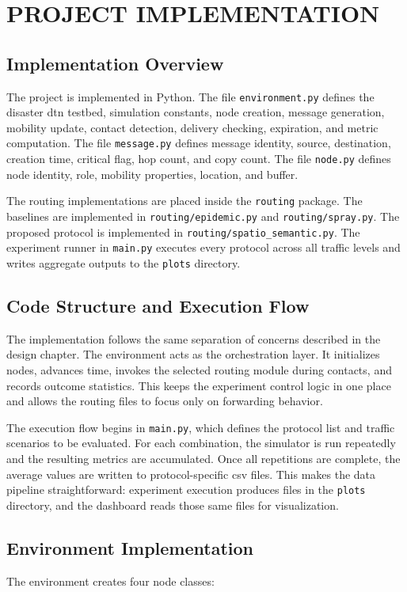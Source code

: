 \chapter{\MakeUppercase{Project Implementation}}
\section{Implementation Overview}
The project is implemented in Python. The file \verb|environment.py| defines the disaster \ac{dtn} testbed, simulation constants, node creation, message generation, mobility update, contact detection, delivery checking, expiration, and metric computation. The file \verb|message.py| defines message identity, source, destination, creation time, critical flag, hop count, and copy count. The file \verb|node.py| defines node identity, role, mobility properties, location, and buffer.

The routing implementations are placed inside the \verb|routing| package. The baselines are implemented in \verb|routing/epidemic.py| and \verb|routing/spray.py|. The proposed protocol is implemented in \verb|routing/spatio_semantic.py|. The experiment runner in \verb|main.py| executes every protocol across all traffic levels and writes aggregate outputs to the \verb|plots| directory.

\section{Code Structure and Execution Flow}
The implementation follows the same separation of concerns described in the design chapter. The environment acts as the orchestration layer. It initializes nodes, advances time, invokes the selected routing module during contacts, and records outcome statistics. This keeps the experiment control logic in one place and allows the routing files to focus only on forwarding behavior.

The execution flow begins in \verb|main.py|, which defines the protocol list and traffic scenarios to be evaluated. For each combination, the simulator is run repeatedly and the resulting metrics are accumulated. Once all repetitions are complete, the average values are written to protocol-specific \ac{csv} files. This makes the data pipeline straightforward: experiment execution produces files in the \verb|plots| directory, and the dashboard reads those same files for visualization.

\section{Environment Implementation}
The environment creates four node classes:

